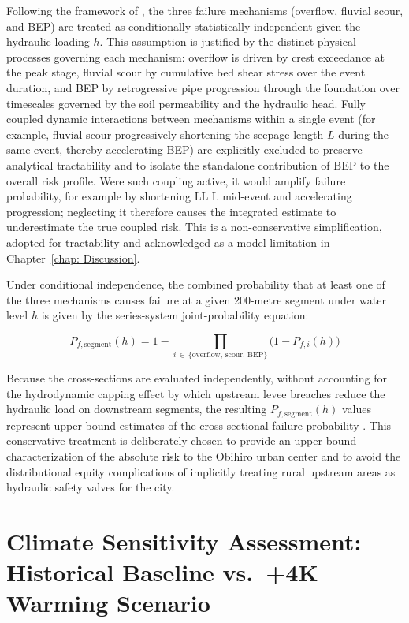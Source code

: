 Following the framework of \textcite{pol_ress_2023}, the three failure mechanisms (overflow, fluvial scour, and BEP) are treated as conditionally statistically independent given the hydraulic loading $h$. This assumption is justified by the distinct physical processes governing each mechanism: overflow is driven by crest exceedance at the peak stage, fluvial scour by cumulative bed shear stress over the event duration, and BEP by retrogressive pipe progression through the foundation over timescales governed by the soil permeability and the hydraulic head. Fully coupled dynamic interactions between mechanisms within a single event (for example, fluvial scour progressively shortening the seepage length $L$ during the same event, thereby accelerating BEP) are explicitly excluded to preserve analytical tractability and to isolate the standalone contribution of BEP to the overall risk profile. Were such coupling active, it would amplify failure probability, for example by shortening LL L mid-event and accelerating progression; neglecting it therefore causes the integrated estimate to underestimate the true coupled risk. This is a non-conservative simplification, adopted for tractability and acknowledged as a model limitation in Chapter~\ref{chap: Discussion}.

Under conditional independence, the combined probability that at least one of the three mechanisms causes failure at a given 200-metre segment under water level $h$ is given by the series-system joint-probability equation:

$$P_{f,\mathrm{segment}}(h) = 1 - \prod_{i\,\in\,\{\mathrm{overflow,\,scour,\,BEP}\}} \bigl(1 - P_{f,i}(h)\bigr)$$

Because the cross-sections are evaluated independently, without accounting for the hydrodynamic capping effect by which upstream levee breaches reduce the hydraulic load on downstream segments, the resulting $P_{f,\mathrm{segment}}(h)$ values represent upper-bound estimates of the cross-sectional failure probability \parencite{pol_ress_2023}. This conservative treatment is deliberately chosen to provide an upper-bound characterization of the absolute risk to the Obihiro urban center and to avoid the distributional equity complications of implicitly treating rural upstream areas as hydraulic safety valves for the city.

\section{Climate Sensitivity Assessment: Historical Baseline vs.\ \texorpdfstring{+4K}{+4K} Warming Scenario}
\label{sec: Climate Sensitivity Assessment: Historical Baseline vs. +4K Warming Scenario}

